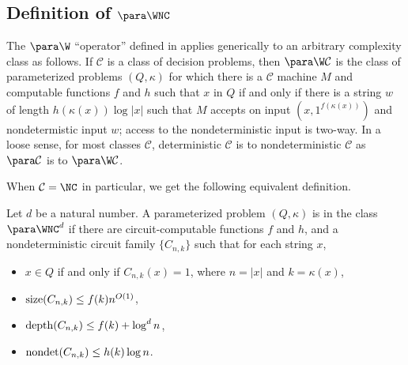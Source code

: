 \subsection{Definition of \texorpdfstring{$\para \WNC$}{paraWNC}}

%
%
%
%
%
%
%
%
%
%
%
%

%
%
%
%
%
%
%
%
%

The $\para \W$ ``operator'' defined in \autocite[Definition~3.1]{est15} applies generically to an arbitrary complexity class as follows.
If $\mathcal{C}$ is a class of decision problems, then $\para \W \mathcal{C}$ is the class of parameterized problems $(Q, \kappa)$ for which there is a $\mathcal{C}$ machine $M$ and computable functions $f$ and $h$ such that $x$ in $Q$ if and only if there is a string $w$ of length $h(\kappa(x)) \log |x|$ such that $M$ accepts on input $(x, 1^{f(\kappa(x))})$ and nondetermistic input $w$; access to the nondeterministic input is two-way.
In a loose sense, for most classes $\mathcal{C}$, deterministic $\mathcal{C}$ is to nondeterministic $\mathcal{C}$ as $\para \mathcal{C}$ is to $\para \W \mathcal{C}$.

When $\mathcal{C} = \NC$ in particular, we get the following equivalent definition.

\begin{definition}
  Let $d$ be a natural number.
  A parameterized problem $(Q, \kappa)$ is in the class $\para \WNC^d$ if there are circuit-computable functions $f$ and $h$, and a nondeterministic circuit family $\{C_{n, k}\}$ such that for each string $x$,
  \begin{itemize}
  \item $x \in Q$ if and only if $C_{n, k}(x) = 1$, where $n = |x|$ and $k = \kappa(x)$,
  \item $\operatorname{size}(C_{n, k}) \leq f(k) n^{O(1)}$,
  \item $\operatorname{depth}(C_{n, k}) \leq f(k) + \log^d n$,
  \item $\operatorname{nondet}(C_{n, k}) \leq h(k) \log n$.
  \end{itemize}
\end{definition}

